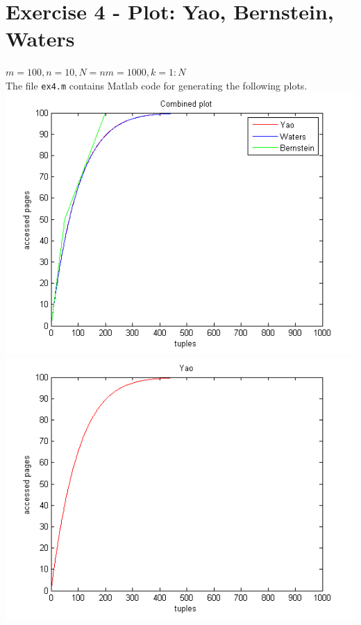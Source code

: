 \documentclass[11pt,a4paper]{scrartcl}
\begin{document}
\section*{Exercise 4 - Plot: Yao, Bernstein, Waters}
$m = 100, n = 10, N = nm = 1000, k = 1:N$\\
The file \verb|ex4.m| contains Matlab code for generating the following plots.\\
\includegraphics{combined}\\
\includegraphics[scale=.9]{yao}\\
\end{document}
